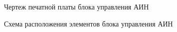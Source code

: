         \begin{figure}[h!]
            \caption{Чертеж печатной платы блока управления АИН}
            \label{fig:control-board-route}
        \end{figure}

        \begin{figure}[h!]
            \caption{Схема расположения элементов блока управления АИН}
            \label{fig:control-board-place}
        \end{figure}

        \clearpage
        
